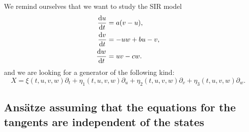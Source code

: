 We remind ourselves that we want to study the SIR model
\begin{equation*}
  \begin{split}
    \dv{u}{t}&=a(v-u),\\
    \dv{v}{t}&=-uw+bu-v,\\
    \dv{w}{t}&=uv-cw.
    \end{split}
  \end{equation*}
  and we are looking for a generator of the following kind:
\begin{equation}
X=\xi(t,u,v,w)\partial_t+\eta_1(t,u,v,w)\partial_u+\eta_2(t,u,v,w)\partial_v+\eta_3(t,u,v,w)\partial_w.
\end{equation}

\subsection{Ans\"atze assuming that the equations for the tangents are independent of the states}